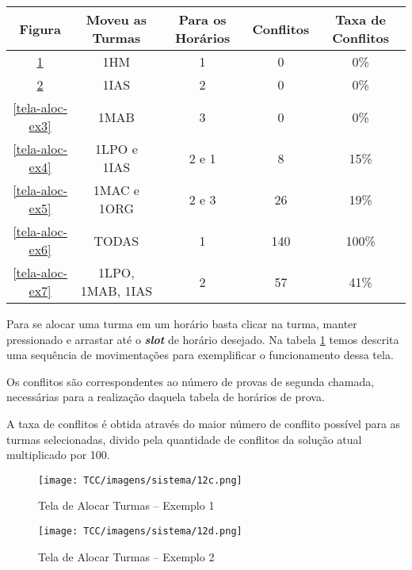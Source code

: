 \begin{anexosenv}
\begin{table}[h]
\begin{tabular}{c|c|c|c|c}
            \textbf{Figura} & \textbf{Moveu as Turmas} & \textbf{Para os Horários}  & \textbf{Conflitos} & \textbf{Taxa de Conflitos}\\ %
            \hline                               %
            \ref{tela-aloc-ex1} &   1HM  &   1  &    0   & 0\% \\
            \ref{tela-aloc-ex2} &   1IAS  &   2  &    0   & 0\% \\
            \ref{tela-aloc-ex3} &   1MAB  &   3  &    0   & 0\% \\
            \ref{tela-aloc-ex4} &  1LPO e 1IAS   &   2 e 1  &    8   & 15\% \\ 
            \ref{tela-aloc-ex5} &  1MAC e 1ORG   &  2 e 3   &    26   & 19\% \\ 
            \ref{tela-aloc-ex6} &   TODAS  &   1  &    140   & 100\% \\ 
            \ref{tela-aloc-ex7} &   1LPO, 1MAB, 1IAS  &   2  &    57   & 41\%
            \\
            \hline
        \end{tabular}
        \label{tabela-exemplo}
    \end{table}

Para se alocar uma turma em um horário basta clicar na turma, manter pressionado e arrastar até o \textbf{\textit{slot}} de horário desejado. Na tabela \ref{tabela-exemplo} temos descrita uma sequência de movimentações para exemplificar o funcionamento dessa tela. 

Os conflitos são correspondentes ao número de provas de segunda chamada, necessárias para a realização daquela tabela de horários de prova. 

A taxa de conflitos é obtida através do maior número de conflito possível para as turmas selecionadas, divido pela quantidade de conflitos da solução atual multiplicado por 100.







\begin{figure}[H]
     \centering
     \texttt{[image: TCC/imagens/sistema/12c.png]}
     \caption{Tela de Alocar Turmas -- Exemplo 1}
     \label{tela-aloc-ex1}
\end{figure}

\begin{figure}[H]
     \centering
     \texttt{[image: TCC/imagens/sistema/12d.png]}
     \caption{Tela de Alocar Turmas -- Exemplo 2}
     \label{tela-aloc-ex2}
\end{figure}


\end{anexosenv}
